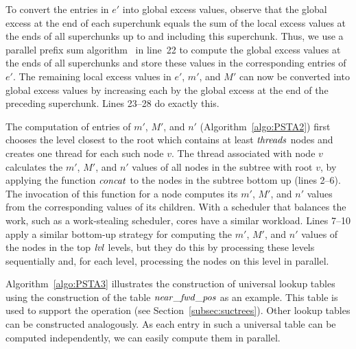 To convert the entries in $e'$ into global excess values, observe that the
global excess at the end of each superchunk equals the sum of the local excess
values at the ends of all superchunks up to and including this superchunk.
Thus, we use a parallel prefix sum algorithm~\cite{Helman2001265} in line~22
to compute the global excess values at the ends of all superchunks and store
these values in the corresponding entries of $e'$.
The remaining local excess values in $e'$, $m'$, and $M'$ can now be converted
into global excess values by increasing each by the global excess at the end
of the preceding superchunk.
Lines 23--28 do exactly this.

The computation of entries of $m'$, $M'$, and $n'$ (Algorithm~\ref{algo:PSTA2})
first chooses the level closest to the root which contains at least $\mathit{threads}$
nodes and creates one thread for each such node $v$.
The thread associated with node $v$ calculates the $m'$, $M'$, and $n'$ values
of all nodes in the subtree with root $v$, by applying the function
$\mathit{concat}$ to the nodes in the subtree bottom up (lines 2--6).
The invocation of this function for a node computes its $m'$, $M'$, and $n'$
values from the corresponding values of its children.
With a scheduler that balances the work, such as a
work-stealing scheduler, cores have a similar workload.
Lines 7--10 apply a similar bottom-up strategy for computing the $m'$, $M'$,
and $n'$ values of the nodes in the top $\mathit{lvl}$ levels, but they do this by
processing these levels sequentially and, for each level, processing the
nodes on this level in parallel.

Algorithm~\ref{algo:PSTA3} illustrates the construction of universal lookup
tables using the construction of the table $\mathit{near\_fwd\_pos}$ as an example.
This table is used to support the {\fwdsearch} operation (see
Section~\ref{subsec:suctrees}).
Other lookup tables can be constructed analogously.
As each entry in such a universal table can be computed independently, we can
easily compute them in parallel.
